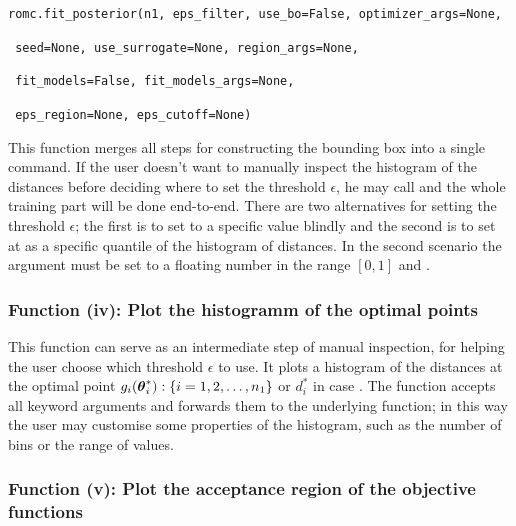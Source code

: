 \texttt{romc.fit_posterior(n1, eps_filter, use_bo=False, optimizer_args=None,}
  
          \texttt{                seed=None, use_surrogate=None, region_args=None,}
  
          \texttt{                fit_models=False, fit_models_args=None,}
  
          \texttt{                eps_region=None, eps_cutoff=None)}

\vspace{5mm}
\noindent

This function merges all steps for constructing the bounding box into
a single command. If the user doesn't want to manually inspect the
histogram of the distances before deciding where to set the threshold
$\epsilon$, he may call  and the whole
training part will be done end-to-end. There are two alternatives for
setting the threshold $\epsilon$; the first is to set to a specific
value blindly and the second is to set at as a specific quantile of
the histogram of distances. In the second scenario the
 argument must be set to a floating number in the
range $[0,1]$ and .


\subsubsection*{Function (iv): Plot the histogramm of the optimal points}

\vspace{5mm}
\noindent


This function can serve as an intermediate step of manual inspection,
for helping the user choose which threshold $\epsilon$ to use. It
plots a histogram of the distances at the optimal point
$g_i(\boldsymbol{\theta}_i^*) : \{i = 1, 2, \ldots, n_1\}$ or
$d_i^*$ in case . The function accepts all
keyword arguments and forwards them to the underlying
 function; in this way the user may
customise some properties of the histogram, such as the number of bins
or the range of values.

\subsubsection*{Function (v): Plot the acceptance region of the objective functions}

\vspace{5mm}
\noindent

